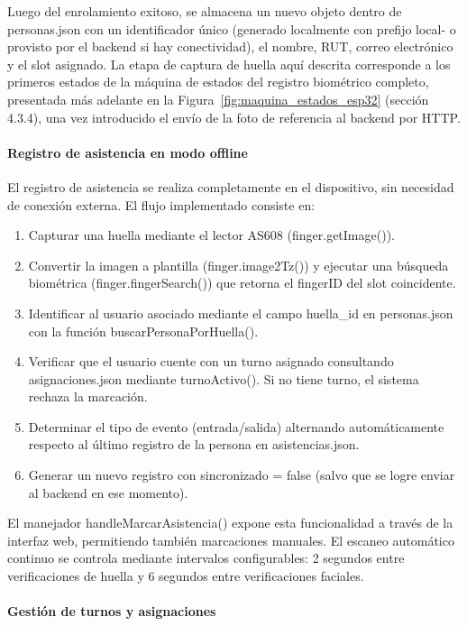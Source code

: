 Luego del enrolamiento exitoso, se almacena un nuevo objeto dentro de personas.json con un identificador único (generado localmente con prefijo local- o provisto por el backend si hay conectividad), el nombre, RUT, correo electrónico y el slot asignado. La etapa de captura de huella aquí descrita corresponde a los primeros estados de la máquina de estados del registro biométrico completo, presentada más adelante en la Figura~\ref{fig:maquina_estados_esp32} (sección 4.3.4), una vez introducido el envío de la foto de referencia al backend por HTTP.

\paragraph{Registro de asistencia en modo offline}

El registro de asistencia se realiza completamente en el dispositivo, sin necesidad de conexión externa. El flujo implementado consiste en:

\begin{enumerate}
    \item Capturar una huella mediante el lector AS608 (finger.getImage()).
    \item Convertir la imagen a plantilla (finger.image2Tz()) y ejecutar una búsqueda biométrica (finger.fingerSearch()) que retorna el fingerID del slot coincidente.
    \item Identificar al usuario asociado mediante el campo huella\_id en personas.json con la función buscarPersonaPorHuella().
    \item Verificar que el usuario cuente con un turno asignado consultando asignaciones.json mediante turnoActivo(). Si no tiene turno, el sistema rechaza la marcación.
    \item Determinar el tipo de evento (entrada/salida) alternando automáticamente respecto al último registro de la persona en asistencias.json.
    \item Generar un nuevo registro con sincronizado = false (salvo que se logre enviar al backend en ese momento).
\end{enumerate}

El manejador handleMarcarAsistencia() expone esta funcionalidad a través de la interfaz web, permitiendo también marcaciones manuales. El escaneo automático continuo se controla mediante intervalos configurables: 2 segundos entre verificaciones de huella y 6 segundos entre verificaciones faciales.

\paragraph{Gestión de turnos y asignaciones}

